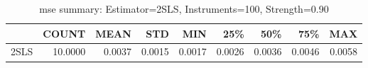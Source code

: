 \begin{table}[ht]
\centering
\caption{mse summary: Estimator=2SLS, Instruments=100, Strength=0.90}
\begin{tabular}{lrrrrrrrr}
\toprule
 & COUNT & MEAN & STD & MIN & 25\% & 50\% & 75\% & MAX \\
\midrule
2SLS & 10.0000 & 0.0037 & 0.0015 & 0.0017 & 0.0026 & 0.0036 & 0.0046 & 0.0058 \\
\bottomrule
\end{tabular}
\end{table}
